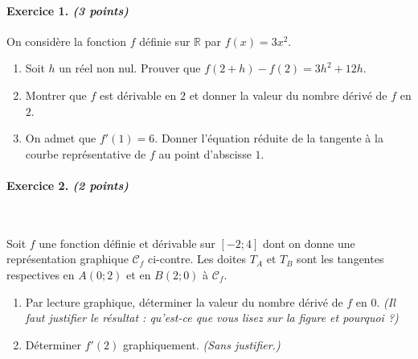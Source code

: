 \documentclass[11pt]{article}
\begin{document}

\paragraph{Exercice 1. \emph{(3 points)}} On considère la fonction $f$ définie sur $\mathbb{R}$
par $f(x)=3x^2$.
\begin{enumerate}
  \item Soit $h$ un réel non nul. Prouver que $f(2+h)-f(2)=3h^2+12h$.
  \item Montrer que $f$ est dérivable en $2$ et donner la valeur du nombre
    dérivé de $f$ en $2$.
  \item On admet que $f'(1)=6$. Donner l'équation réduite de la tangente à la
    courbe représentative de $f$ au point d'abscisse $1$.
\end{enumerate}

\newcommand{\Cf}{\mathscr C_f}
\paragraph{Exercice 2. \emph{(2 points)}}~\\
\begin{minipage}{.5\textwidth}
  Soit $f$ une fonction définie et dérivable sur $[-2;4]$ dont on donne une
  représentation graphique $\Cf$ ci-contre. Les doites $T_A$ et $T_B$ sont les
  tangentes respectives en $A(0; 2)$ et en $B(2;0)$ à $\Cf$.
  \begin{enumerate}
    \item Par lecture graphique, déterminer la valeur du nombre dérivé de $f$ en
      $0$. \emph{(Il faut justifier le résultat : qu'est-ce que vous lisez sur
      la figure et pourquoi ?)}
    \item Déterminer $f'(2)$ graphiquement. \emph{(Sans justifier.)}
  \end{enumerate}
\end{minipage}
\begin{minipage}{.5\textwidth}
\begin{center}
\end{center}
\end{minipage}
\end{document}
